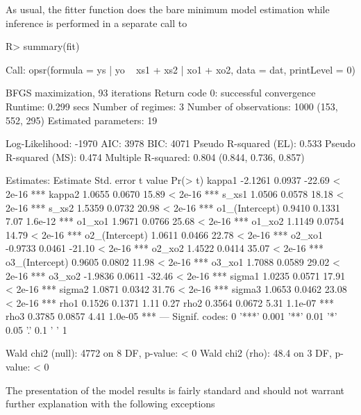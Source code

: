 \documentclass[%
    twoside, openright, titlepage, numbers=noenddot,%
    cleardoublepage=empty,%
    abstract=false,%
    BCOR=5.5mm, paper=a5, fontsize=10pt,%
]{scrreprt}
\begin{document}
As usual, the fitter function does the bare minimum model estimation while inference is performed in a separate call to
%
\begin{Schunk}
\begin{Sinput}
R> summary(fit)
\end{Sinput}
\begin{Soutput}
Call:
opsr(formula = ys | yo ~ xs1 + xs2 | xo1 + xo2, data = dat, printLevel = 0)

BFGS maximization, 93 iterations
Return code 0: successful convergence 
Runtime: 0.299 secs
Number of regimes: 3 
Number of observations: 1000 (153, 552, 295)
Estimated parameters: 19 

Log-Likelihood: -1970 
AIC: 3978 
BIC: 4071 
Pseudo R-squared (EL): 0.533 
Pseudo R-squared (MS): 0.474 
Multiple R-squared: 0.804 (0.844, 0.736, 0.857)

Estimates:
               Estimate Std. error t value Pr(> t)    
kappa1          -2.1261     0.0937  -22.69 < 2e-16 ***
kappa2           1.0655     0.0670   15.89 < 2e-16 ***
s_xs1            1.0506     0.0578   18.18 < 2e-16 ***
s_xs2            1.5359     0.0732   20.98 < 2e-16 ***
o1_(Intercept)   0.9410     0.1331    7.07 1.6e-12 ***
o1_xo1           1.9671     0.0766   25.68 < 2e-16 ***
o1_xo2           1.1149     0.0754   14.79 < 2e-16 ***
o2_(Intercept)   1.0611     0.0466   22.78 < 2e-16 ***
o2_xo1          -0.9733     0.0461  -21.10 < 2e-16 ***
o2_xo2           1.4522     0.0414   35.07 < 2e-16 ***
o3_(Intercept)   0.9605     0.0802   11.98 < 2e-16 ***
o3_xo1           1.7088     0.0589   29.02 < 2e-16 ***
o3_xo2          -1.9836     0.0611  -32.46 < 2e-16 ***
sigma1           1.0235     0.0571   17.91 < 2e-16 ***
sigma2           1.0871     0.0342   31.76 < 2e-16 ***
sigma3           1.0653     0.0462   23.08 < 2e-16 ***
rho1             0.1526     0.1371    1.11    0.27    
rho2             0.3564     0.0672    5.31 1.1e-07 ***
rho3             0.3785     0.0857    4.41 1.0e-05 ***
---
Signif. codes:  0 '***' 0.001 '**' 0.01 '*' 0.05 '.' 0.1 ' ' 1

Wald chi2 (null): 4772 on 8 DF, p-value: < 0
Wald chi2 (rho): 48.4 on 3 DF, p-value: < 0
\end{Soutput}
\end{Schunk}
%
The presentation of the model results is fairly standard and should not warrant further explanation with the following exceptions
\end{document}
